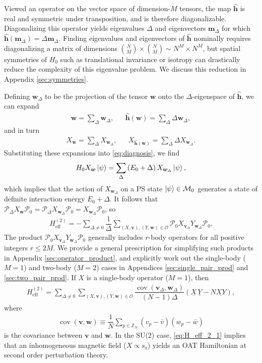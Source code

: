 \documentclass[nofootinbib,notitlepage,11pt]{revtex4-2}
\renewcommand{\t}{\text} %
\newcommand{\f}[2]{\dfrac{#1}{#2}} %
\newcommand{\p}[1]{\left(#1\right)} %
\newcommand{\m}{\bm} %
\newcommand{\1}{\mathds{1}}
\newcommand{\z}{\text{z}}
\newcommand{\M}{\mathcal{M}}
\renewcommand{\O}{\mathcal{O}}
\renewcommand{\P}{\mathcal{P}}
\newcommand{\ZZ}{\mathbb{Z}}
\newcommand{\col}{\underline}
\DeclareMathOperator{\cov}{cov}
\begin{document}
Viewed an operator on the vector space of dimension-$M$ tensors, the
map $\hat{\m h}$ is real and symmetric under transposition, and is
therefore diagonalizable.  Diagonalizing this operator yields
eigenvalues $\Delta$ and eigenvectors $\m m_\Delta$ for which
$\hat{\m h}\p{\m m_\Delta}=\Delta\m m_\Delta$.  Finding eigenvalues
and eigenvectors of $\hat{\m h}$ nominally requires diagonalizing a
matrix of dimensions
${N\choose M}\times{N\choose M}\sim N^M\times N^M$, but spatial
symmetries of $H_0$ such as translational invariance or isotropy can
drastically reduce the complexity of this eigenvalue problem.  We
discuss this reduction in Appendix \ref{sec:symmetries}.

Defining $\m w_\Delta$ to be the projection of the tensor $\m w$ onto
the $\Delta$-eigenspace of $\hat{\m h}$, we can expand
\begin{align}
  \m w = \sum_\Delta \m w_\Delta,
  &&
  \hat{\m h}\p{\m w} = \sum_\Delta \Delta \m w_\Delta,
\end{align}
and in turn
\begin{align}
  X_{\m w} = \sum_\Delta X_{\m w_\Delta},
  &&
  X_{\hat{\m h}\p{\m w}} = \sum_\Delta \Delta X_{\m w_\Delta}.
\end{align}
Substituting these expansions into \eqref{eq:diagnosis}, we find
\begin{align}
  H_0 X_{\m w} \ket\psi
  = \sum_\Delta\p{E_0 + \Delta} X_{\m w_\Delta} \ket\psi,
\end{align}
which implies that the action of $X_{\m w_\Delta}$ on a PS state
$\ket\psi\in\M_0$ generates a state of definite interaction energy
$E_0+\Delta$.  It follows that
$\P_\Delta X_{\m w} \P_0 = \P_\Delta X_{\m w_\Delta} \P_0 =
X_{\m{w}_\Delta} \P_0$, so
\begin{align}
  H_{\t{eff}}^{(2)} = -\sum_{\Delta\ne0} \f1\Delta
  \sum_{\p{X,\m v},\p{Y,\m w}\in\O}
  \P_0 X_{\m v_\Delta} Y_{\m w_\Delta} \P_0.
\end{align}
The product $\P_0 X_{\m v_\Delta} Y_{\m w_\Delta} \P_0$ generally
includes $r$-body operators for all positive integers $r\le2M$.  We
provide a general prescription for simplifying such products in
Appendix \ref{sec:operator_product}, and explicitly work out the
single-body ($M=1$) and two-body ($M=2$) cases in Appendices
\ref{sec:single_pair_prod} and \ref{sec:two_pair_prod}.  If $X$ is a
single-body operator ($M=1$), then
\begin{align}
  H_{\t{eff}}^{(2)}
  = \sum_{\Delta\ne0} \sum_{\p{X,\m v},\p{Y,\m w}\in\O}
  \f{\cov\p{\m v_\Delta,\m w_\Delta}}{\p{N-1}\Delta}
  \p{\col{X}\,\col{Y} - N \col{XY}},
  \label{eq:H_eff_2_1}
\end{align}
where
\begin{align}
  \cov\p{\m v,\m w} \equiv
  \f1N \sum_{p\in\ZZ_N} \p{v_p-\bar v}\p{w_p-\bar w}
\end{align}
is the covariance between $\m v$ and $\m w$.  In the SU(2) case,
\eqref{eq:H_eff_2_1} implies that an inhomogeneous magnetic field
($X\propto s_\z$) yields an OAT Hamiltonian at second order
perturbation theory.
\end{document}
